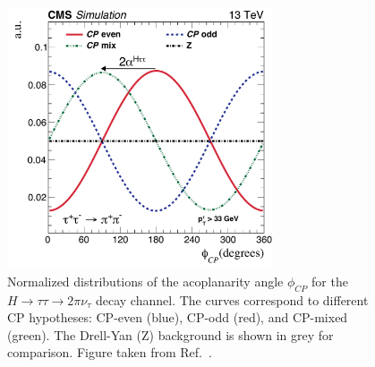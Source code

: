 \begin{figure}[h]
\centering
\includegraphics[width=0.7\textwidth]{Figures/Chapter2/AcoplanarityScenarios.pdf}
\caption[Acoplanarity angle $\phi_{CP}$ distributions for different CP hypotheses in $H \rightarrow \tau\tau$ decays]{Normalized distributions of the acoplanarity angle $\phi_{CP}$ for the $H \rightarrow \tau\tau \rightarrow 2\pi\nu_{\tau}$ decay channel. The curves correspond to different CP hypotheses: CP-even (blue), CP-odd (red), and CP-mixed (green). The Drell-Yan (Z) background is shown in grey for comparison. Figure taken from Ref.~\cite{HiggsCP_CMS_2021}.}
\label{Figure:Chapter2_PhiCP_Gen}
\end{figure}
